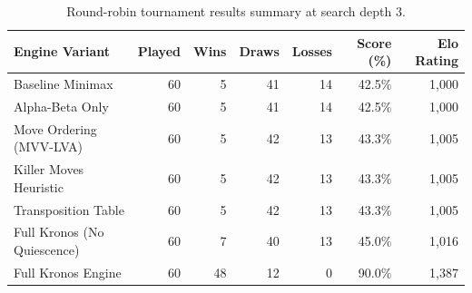 \begin{table}[htbp]
\centering
\caption[Tournament Results Summary at Depth 3]{Round-robin tournament results summary at search depth 3.}
\label{tab:tournament_results}
\begin{tabularx}{\textwidth}{Xrrrrrr}
\toprule
\textbf{Engine Variant} & \textbf{Played} & \textbf{Wins} & \textbf{Draws} & \textbf{Losses} & \textbf{Score (\%)} & \textbf{Elo Rating} \\
\midrule
Baseline Minimax            & 60 & 5  & 41 & 14 & 42.5\% & 1,000 \\
Alpha-Beta Only             & 60 & 5  & 41 & 14 & 42.5\% & 1,000 \\
Move Ordering (MVV-LVA)     & 60 & 5  & 42 & 13 & 43.3\% & 1,005 \\
Killer Moves Heuristic      & 60 & 5  & 42 & 13 & 43.3\% & 1,005 \\
Transposition Table         & 60 & 5  & 42 & 13 & 43.3\% & 1,005 \\
Full Kronos (No Quiescence) & 60 & 7  & 40 & 13 & 45.0\% & 1,016 \\
Full Kronos Engine          & 60 & 48 & 12 & 0  & 90.0\% & 1,387 \\
\bottomrule
\end{tabularx}
\end{table}

